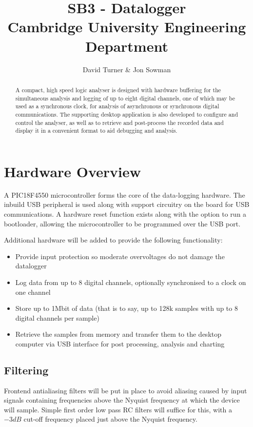 \documentclass[11pt]{article}
\title{SB3 - Datalogger\\Cambridge University Engineering Department}
\author{David Turner \& Jon Sowman}
\begin{document}
    \maketitle
	
\begin{abstract}
    A compact, high speed logic analyser is designed with hardware buffering for the simultaneous analysis and logging of up to eight digital channels, one of which may be used as a synchronous clock, for analysis of asynchronous or synchronous digital communications. The supporting desktop application is also developed to configure and control the analyser, as well as to retrieve and post-process the recorded data and display it in a convenient format to aid debugging and analysis.
\end{abstract}

\section{Hardware Overview}
    A PIC18F4550 microcontroller forms the core of the data-logging hardware. The inbuild USB peripheral is used along with support circuitry on the board for USB communications. A hardware reset function exists along with the option to run a bootloader, allowing the microcontroller to be programmed over the USB port.

    Additional hardware will be added to provide the following functionality:
    \begin{itemize}
    \item Provide input protection so moderate overvoltages do not damage the datalogger
    \item Log data from up to 8 digital channels, optionally synchronised to a clock on one channel
    \item Store up to 1Mbit of data (that is to say, up to 128k samples with up to 8 digital channels per sample)
    \item Retrieve the samples from memory and transfer them to the desktop computer via USB interface for post processing, analysis and charting
    \end{itemize}

\subsection{Filtering}
    Frontend antialiasing filters will be put in place to avoid aliasing caused by input signals containing frequencies above the Nyquist frequency at which the device will sample. Simple first order low pass RC filters will suffice for this, with a $-3dB$ cut-off frequency placed just above the Nyquist frequency.
\end{document}
